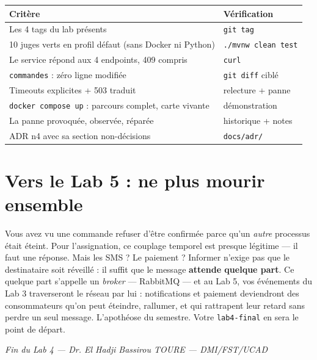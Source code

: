\documentclass[a4paper,11pt]{article}
\begin{document}
\begin{center}
\small
\begin{tabular}{p{}p{}}
\toprule
\textbf{Critère} & \textbf{Vérification} \\
\midrule
Les 4 tags du lab présents & \texttt{git tag} \\
10 juges verts en profil défaut (sans Docker ni Python) & \texttt{./mvnw clean test} \\
Le service répond aux 4 endpoints, 409 compris & \texttt{curl} \\
\texttt{commandes} : zéro ligne modifiée & \texttt{git diff} ciblé \\
Timeouts explicites + 503 traduit & relecture + panne \\
\texttt{docker compose up} : parcours complet, carte vivante & démonstration \\
La panne provoquée, observée, réparée & historique + notes \\
ADR n\up{o}4 avec sa section non-décisions & \texttt{docs/adr/} \\
\bottomrule
\end{tabular}
\end{center}

\section{Vers le Lab 5 : ne plus mourir ensemble}

Vous avez vu une commande refuser d'être confirmée parce qu'un
\emph{autre} processus était éteint. Pour l'assignation, ce couplage
temporel est presque légitime --- il faut une réponse. Mais les SMS ? Le
paiement ? Informer n'exige pas que le destinataire soit réveillé :
il suffit que le message \textbf{attende quelque part}. Ce quelque part
s'appelle un \emph{broker} --- RabbitMQ --- et au Lab 5, vos événements
du Lab 3 traverseront le réseau par lui : notifications et paiement
deviendront des consommateurs qu'on peut éteindre, rallumer, et qui
rattrapent leur retard sans perdre un seul message. L'apothéose du
semestre. Votre \texttt{lab4-final} en sera le point de départ.

\vspace{1em}
\begin{center}
\textit{Fin du Lab 4 --- Dr. El Hadji Bassirou TOURE --- DMI/FST/UCAD}
\end{center}
\end{document}
